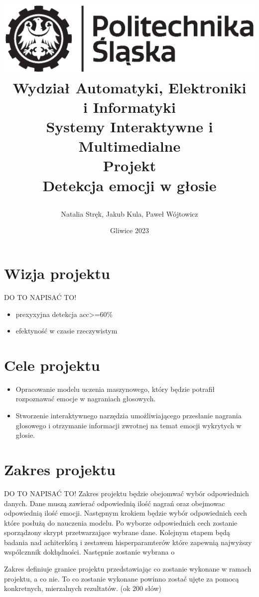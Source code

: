 \documentclass[12pt,titlepage]{article}
\title{
\includegraphics[scale=0.75]{img/politechnika_sl_logo_bw_poziom_pl.eps}\\
\textbf{Wydział Automatyki, Elektroniki\\
i Informatyki}\\
\vspace*{1cm}
Systemy Interaktywne i Multimedialne \\ Projekt \\ Detekcja emocji w głosie

\vspace*{5cm}
}
\author{
Natalia Stręk,
Jakub Kula,
Paweł Wójtowicz
}
\date{Gliwice 2023}
\begin{document}
\maketitle

\tableofcontents

\newpage


\section{Wizja projektu}
DO TO NAPISAĆ TO!
\begin{itemize}
    \item prexyxyjna detekcja acc>=60\%
    \item efektyność w czasie rzeczywistym
\end{itemize}

\section{Cele projektu}
\begin{itemize}
    \item Opracowanie modelu uczenia maszynowego, który będzie potrafił rozpoznawać emocje w nagraniach głosowych.
    \item Stworzenie interaktywnego narzędzia umożliwiającego przesłanie nagrania głosowego i otrzymanie informacji zwrotnej na temat emocji wykrytych w głosie.
\end{itemize}

\section{Zakres projektu}
DO TO NAPISAĆ TO!
Zakres projektu będzie obejomwać wybór odpowiednich danych. Dane muszą zawierać odpowiednią ilość nagrań oraz obejmowac odpowiednią ilość emocji.
Następnym krokiem będzie wybór odpowiednich cech które posłużą do nauczenia modelu. Po wyborze odpowiednich cech zostanie sporządzony skrypt przetwarzające wybrane dane. Kolejnym etapem będą badania nad achiterkórą i zestawem hisperparamterów które zapewnią najwyższy wspólcznnik dokłądności. Następnie zostanie wybrana o

Zakres definiuje granice projektu przedstawiając co zostanie wykonane w ramach projektu, a co nie. To co zostanie wykonane powinno zostać ujęte za pomocą konkretnych, mierzalnych rezultatów. (ok 200 słów)\\
\end{document}
